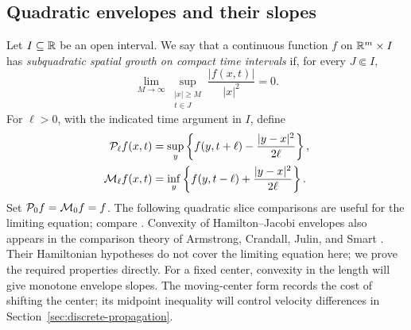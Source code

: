 \subsection{Quadratic envelopes and their slopes}

Let $I\subseteq\mathbb{R}$ be an open interval. We say that a continuous
function $f$ on $\mathbb{R}^m\times I$ has \emph{subquadratic spatial
growth on compact time intervals} if, for every $J\Subset I$,
\[
  \lim_{M\to\infty}
  \sup_{\substack{|x|\ge M\\t\in J}}\frac{|f(x,t)|}{|x|^2}=0.
\]
For $\ell>0$, with the indicated time argument in $I$, define
\begin{equation}\label{eq:envelope-definitions}
  \begin{split}
  \mathcal{P}_\ell f(x,t)
    &=\sup_y\left\{f(y,t+\ell)-\frac{|y-x|^2}{2\ell}\right\},\\
  \mathcal{M}_\ell f(x,t)
    &=\inf_y\left\{f(y,t-\ell)+\frac{|y-x|^2}{2\ell}\right\}.
  \end{split}
\end{equation}
Set $\mathcal{P}_0f=\mathcal{M}_0f=f$. The following quadratic slice
comparisons are useful for the limiting equation; compare
\cite[Section~3]{EvansSavin2008}. Convexity of Hamilton--Jacobi envelopes also
appears in the comparison theory of Armstrong, Crandall, Julin, and Smart
\cite[Proposition~2.3]{ArmstrongCrandallJulinSmart2011}. Their Hamiltonian
hypotheses do not cover the limiting equation here; we prove the required
properties directly.
For a fixed center, convexity in the length will give monotone envelope
slopes. The moving-center form records the cost of shifting the center;
its midpoint inequality will control velocity differences in
Section~\ref{sec:discrete-propagation}.

